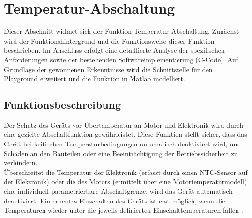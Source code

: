 \section{Temperatur-Abschaltung}
Dieser Abschnitt widmet sich der Funktion Temperatur-Abschaltung. Zunächst wird der Funktionshintergrund und die Funktionsweise dieser Funktion beschrieben. Im Anschluss erfolgt eine detaillierte Analyse der spezifischen Anforderungen sowie der bestehenden Softwareimplementierung (C-Code). Auf Grundlage der gewonnenen Erkenntnisse wird die Schnittstelle für den Playground erweitert und die Funktion in Matlab modelliert.

\subsection{Funktionsbeschreibung}
Der Schutz des Geräts vor Übertemperatur an Motor und Elektronik wird durch eine gezielte Abschaltfunktion gewährleistet. Diese Funktion stellt sicher, dass das Gerät bei kritischen Temperaturbedingungen automatisch deaktiviert wird, um Schäden an den Bauteilen oder eine Beeinträchtigung der Betriebssicherheit zu verhindern.\\
Überschreitet die Temperatur der Elektronik (erfasst durch einen NTC-Sensor auf der Elektronik) oder die des Motors (ermittelt über eine Motortemperaturmodell) eine individuell parametrierbare Abschaltgrenze, wird das Gerät automatisch deaktiviert. Ein erneutes Einschalten des Geräts ist erst möglich, wenn die Temperaturen wieder unter die jeweils definierten Einschalttemperaturen fallen \cite{SW_ZUSE}.

